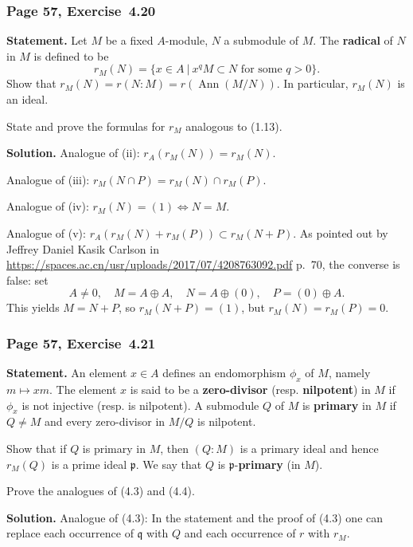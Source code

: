 \documentclass[12pt,letterpaper]{article}%
\newcommand{\oo}{\operatorname}\newcommand{\ooo}{\operatorname*}
\newcommand{\mf}{\mathfrak}
\newcommand{\ppp}{\mf p}
\newcommand{\qqq}{\mf q}
\newcommand{\Ann}{\oo{Ann}}
\newcommand{\nn}{\noindent}
\begin{document}
\subsubsection{Page 57, Exercise~4.20}%

\textbf{Statement.} Let $M$ be a fixed $A$-module, $N$ a submodule of $M$. The \textbf{radical} of $N$ in $M$ is defined to be
$$
r_M(N)=\{x\in A\ |\ x^qM\subset N\text{ for some }q>0\}.
$$ 
Show that $r_M(N)=r(N:M)=r(\Ann(M/N))$. In particular, $r_M(N)$ is an ideal.

State and prove the formulas for $r_M$ analogous to (1.13).

\nn\textbf{Solution.} Analogue of (ii): $r_A(r_M(N))=r_M(N)$. 

\nn Analogue of (iii): $r_M(N\cap P)=r_M(N)\cap r_M(P)$. 

\nn Analogue of (iv): $r_M(N)=(1)\iff N=M$.

\nn Analogue of (v): $r_A(r_M(N)+r_M(P))\subset r_M(N+P)$. As pointed out by Jeffrey Daniel Kasik Carlson in \href{https://spaces.ac.cn/usr/uploads/2017/07/4208763092.pdf}{https://spaces.ac.cn/usr/uploads/2017/07/4208763092.pdf} p.~70, the converse is false: set 
$$
A\ne0,\quad M=A\oplus A,\quad N=A\oplus(0),\quad P=(0)\oplus A.
$$ 
This yields $M=N+P$, so $r_M(N+P)=(1)$, but $r_M(N)=r_M(P)=0$. 

\subsubsection{Page 57, Exercise~4.21}%

\textbf{Statement.} An element $x\in A$ defines an endomorphism $\phi_x$ of $M$, namely $m\mapsto xm$. The element $x$ is said to be a \textbf{zero-divisor} (resp. \textbf{nilpotent}) in $M$ if $\phi_x$ is not injective (resp. is nilpotent). A submodule $Q$ of $M$ is \textbf{primary} in $M$ if $Q\ne M$ and every zero-divisor in $M/Q$ is nilpotent.

Show that if $Q$ is primary in $M$, then $(Q:M)$ is a primary ideal and hence $r_M(Q)$ is a prime ideal $\ppp$. We say that $Q$ is $\ppp$-\textbf{primary} (in $M$).

Prove the analogues of (4.3) and (4.4).

\nn\textbf{Solution.} Analogue of (4.3): In the statement and the proof of (4.3) one can replace each occurrence of $\qqq$ with $Q$ and each occurrence of $r$ with $r_M$.%
\end{document}
